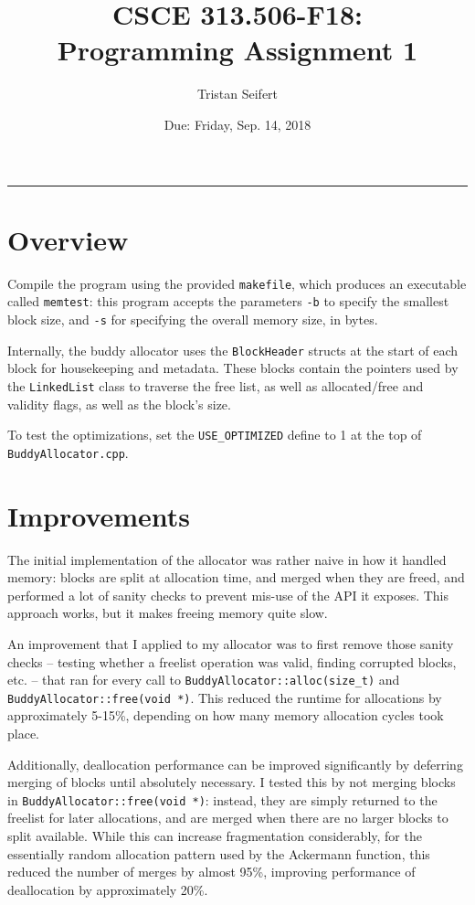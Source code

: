 \documentclass[10pt]{article}
\title{CSCE 313.506-F18: \\Programming Assignment 1}
\author{Tristan Seifert}
\date{Due: Friday, Sep. 14, 2018}
\begin{document}
\maketitle

\hrule

\section{Overview}
Compile the program using the provided \texttt{makefile}, which produces an executable called \texttt{memtest}: this program accepts the parameters \texttt{-b} to specify the smallest block size, and \texttt{-s} for specifying the overall memory size, in bytes.

Internally, the buddy allocator uses the \texttt{BlockHeader} structs at the start of each block for housekeeping and metadata. These blocks contain the pointers used by the \texttt{LinkedList} class to traverse the free list, as well as allocated/free and validity flags, as well as the block's size.

To test the optimizations, set the \texttt{USE\_OPTIMIZED} define to 1 at the top of \texttt{BuddyAllocator.cpp}.

\section{Improvements}
The initial implementation of the allocator was rather naive in how it handled memory: blocks are split at allocation time, and merged when they are freed, and performed a lot of sanity checks to prevent mis-use of the API it exposes. This approach works, but it makes freeing memory quite slow.

An improvement that I applied to my allocator was to first remove those sanity checks -- testing whether a freelist operation was valid, finding corrupted blocks, etc. -- that ran for every call to \texttt{BuddyAllocator::alloc(size\_t)} and \texttt{BuddyAllocator::free(void *)}. This reduced the runtime for allocations by approximately 5-15\%, depending on how many memory allocation cycles took place.

Additionally, deallocation performance can be improved significantly by deferring merging of blocks until absolutely necessary. I tested this by not merging blocks in \texttt{BuddyAllocator::free(void *)}: instead, they are simply returned to the freelist for later allocations, and are merged when there are no larger blocks to split available. While this can increase fragmentation considerably, for the essentially random allocation pattern used by the Ackermann function, this reduced the number of merges by almost 95\%, improving performance of deallocation by approximately 20\%.
\end{document}
